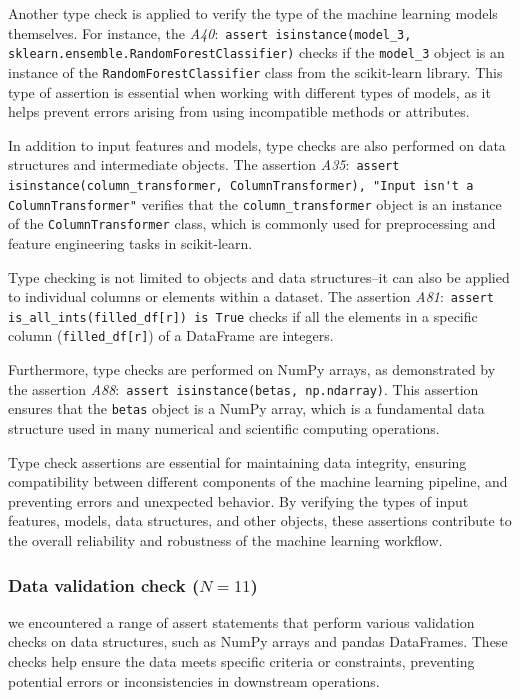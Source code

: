 Another type check is applied to verify the type of the machine learning models themselves. For instance, the \emph{A40}:~\lstinline{assert isinstance(model_3, sklearn.ensemble.RandomForestClassifier)} checks if the \lstinline{model_3} object is an instance of the \lstinline{RandomForestClassifier} class from the scikit-learn library. This type of assertion is essential when working with different types of models, as it helps prevent errors arising from using incompatible methods or attributes.

In addition to input features and models, type checks are also performed on data structures and intermediate objects. The assertion \emph{A35}:~\lstinline{assert isinstance(column_transformer, ColumnTransformer), "Input isn't a ColumnTransformer"} verifies that the \lstinline{column_transformer} object is an instance of the \lstinline{ColumnTransformer} class, which is commonly used for preprocessing and feature engineering tasks in scikit-learn.

Type checking is not limited to objects and data structures--it can also be applied to individual columns or elements within a dataset. The assertion \emph{A81}:~\lstinline{assert is_all_ints(filled_df[r]) is True} checks if all the elements in a specific column (\lstinline{filled_df[r]}) of a DataFrame are integers.

Furthermore, type checks are performed on NumPy arrays, as demonstrated by the assertion \emph{A88}:~\lstinline{assert isinstance(betas, np.ndarray)}. This assertion ensures that the \texttt{betas} object is a NumPy array, which is a fundamental data structure used in many numerical and scientific computing operations.

Type check assertions are essential for maintaining data integrity, ensuring compatibility between different components of the machine learning pipeline, and preventing errors and unexpected behavior. By verifying the types of input features, models, data structures, and other objects, these assertions contribute to the overall reliability and robustness of the machine learning workflow.

\subsubsection{Data validation check ($N = 11$)}

we encountered a range of assert statements that perform various validation checks on data structures, such as NumPy arrays and pandas DataFrames. These checks help ensure the data meets specific criteria or constraints, preventing potential errors or inconsistencies in downstream operations.

